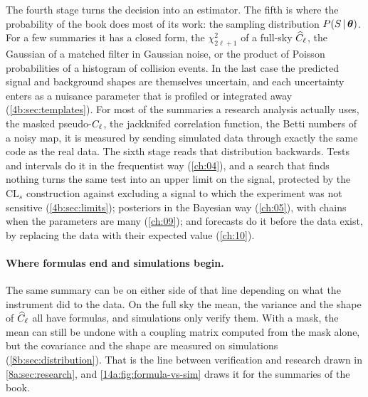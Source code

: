 The fourth stage turns the decision into an estimator. The fifth is where the
probability of the book does most of its work: the sampling distribution
$P(S\,\vert\,\bm{\theta})$. For a few summaries it has a closed form, the $\chi^2_{2\ell+1}$ of a
full-sky $\widehat{C}_\ell$, the Gaussian of a matched filter in Gaussian noise, or the product
of Poisson probabilities of a histogram of collision events. In the last case the
predicted signal and background shapes are themselves uncertain, and each uncertainty
enters as a nuisance parameter that is profiled or integrated away
(\cref{4b:sec:templates}). For most of the
summaries a research analysis actually uses, the masked pseudo-$C_\ell$, the jackknifed
correlation function, the Betti numbers of a noisy map, it is measured by sending
simulated data through exactly the same code as the real data. The sixth stage reads
that distribution backwards. Tests and intervals do it in the frequentist way
(\cref{ch:04}), and a search that finds nothing turns the same test into an upper
limit on the signal, protected by the $\mathrm{CL}_s$ construction against excluding a
signal to which the experiment was not sensitive (\cref{4b:sec:limits}); posteriors in the Bayesian way (\cref{ch:05}), with chains when the
parameters are many (\cref{ch:09}); and forecasts do it before the data exist, by
replacing the data with their expected value (\cref{ch:10}).

\paragraph{Where formulas end and simulations begin.}
The same summary can be on either side of that line depending on what the instrument
did to the data. On the full sky the mean, the variance and the shape of $\widehat{C}_\ell$ all
have formulas, and simulations only verify them. With a mask, the mean can still be
undone with a coupling matrix computed from the mask alone, but the covariance and the
shape are measured on simulations (\cref{8b:sec:distribution}). That is the line between
verification and research drawn in \cref{8a:sec:research}, and
\cref{14a:fig:formula-vs-sim} draws it for the summaries of the book.

